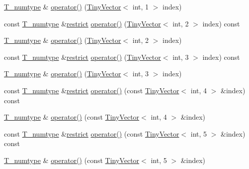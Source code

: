 \begin{DoxyCompactItemize}
\item 
\hyperlink{classArray_ae72770f4a1d2f8b7193badafc320f008}{T\+\_\+numtype} \& \hyperlink{classArray_a9d67eda4b44963c9c470df762de93e06}{operator()} (\hyperlink{classTinyVector}{Tiny\+Vector}$<$ int, 1 $>$ index)
\item 
const \hyperlink{classArray_ae72770f4a1d2f8b7193badafc320f008}{T\+\_\+numtype} \&\hyperlink{compiler_8h_a080abdcb9c02438f1cd2bb707af25af8}{restrict} \hyperlink{classArray_a6eb659f5dc3e23491f8da81f415a2b95}{operator()} (\hyperlink{classTinyVector}{Tiny\+Vector}$<$ int, 2 $>$ index) const 
\item 
\hyperlink{classArray_ae72770f4a1d2f8b7193badafc320f008}{T\+\_\+numtype} \& \hyperlink{classArray_aefd3aafd5bc4128581b61d20ff301e40}{operator()} (\hyperlink{classTinyVector}{Tiny\+Vector}$<$ int, 2 $>$ index)
\item 
const \hyperlink{classArray_ae72770f4a1d2f8b7193badafc320f008}{T\+\_\+numtype} \&\hyperlink{compiler_8h_a080abdcb9c02438f1cd2bb707af25af8}{restrict} \hyperlink{classArray_a48ccde3bedca818bb67390818d05e492}{operator()} (\hyperlink{classTinyVector}{Tiny\+Vector}$<$ int, 3 $>$ index) const 
\item 
\hyperlink{classArray_ae72770f4a1d2f8b7193badafc320f008}{T\+\_\+numtype} \& \hyperlink{classArray_a2f3b69e4d9199756253a178b7bbe2936}{operator()} (\hyperlink{classTinyVector}{Tiny\+Vector}$<$ int, 3 $>$ index)
\item 
const \hyperlink{classArray_ae72770f4a1d2f8b7193badafc320f008}{T\+\_\+numtype} \&\hyperlink{compiler_8h_a080abdcb9c02438f1cd2bb707af25af8}{restrict} \hyperlink{classArray_a1513d0330d79e1f0051fdb02b777507d}{operator()} (const \hyperlink{classTinyVector}{Tiny\+Vector}$<$ int, 4 $>$ \&index) const 
\item 
\hyperlink{classArray_ae72770f4a1d2f8b7193badafc320f008}{T\+\_\+numtype} \& \hyperlink{classArray_ab8e3a9b188cb388acabc8005dc1e6f6f}{operator()} (const \hyperlink{classTinyVector}{Tiny\+Vector}$<$ int, 4 $>$ \&index)
\item 
const \hyperlink{classArray_ae72770f4a1d2f8b7193badafc320f008}{T\+\_\+numtype} \&\hyperlink{compiler_8h_a080abdcb9c02438f1cd2bb707af25af8}{restrict} \hyperlink{classArray_a2c48c16a7aba185cb6e71af4588df1ba}{operator()} (const \hyperlink{classTinyVector}{Tiny\+Vector}$<$ int, 5 $>$ \&index) const 
\item 
\hyperlink{classArray_ae72770f4a1d2f8b7193badafc320f008}{T\+\_\+numtype} \& \hyperlink{classArray_ac3afef5299296665c6163740ca625e2e}{operator()} (const \hyperlink{classTinyVector}{Tiny\+Vector}$<$ int, 5 $>$ \&index)

\end{DoxyCompactItemize}
